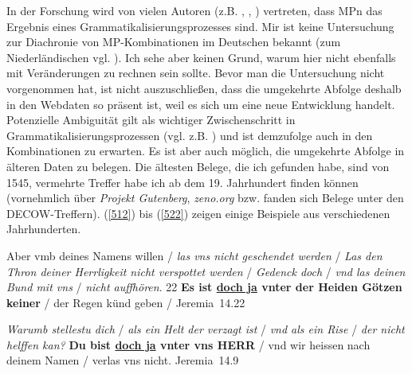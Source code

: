 In der Forschung wird von vielen Autoren (z.B. \citealt{Abraham1991b}, \citealt{Diewald1997}, \citealt{Wegener2002}) vertreten, dass MPn das Ergebnis eines Grammatikalisierungspro\-zesses sind. Mir ist keine Untersuchung zur Diachronie von MP-Kombinationen im Deutschen bekannt (zum Niederländischen vgl. \citealt{Hoeksema2008}). Ich sehe aber keinen Grund, warum hier nicht ebenfalls mit Veränderungen zu rechnen sein sollte. Bevor man die Untersuchung nicht vorgenommen hat, ist nicht auszu\-schließen, dass die umgekehrte Abfolge deshalb in den Webdaten so präsent ist, weil es sich um eine neue Entwicklung handelt. Potenzielle Ambiguität  gilt als wichtiger Zwischenschritt in  Grammatikalisierungsprozessen (vgl. z.B. \citealt[137-138, 141, 144]{Diewald2008})  und ist demzufolge auch in den Kombinationen zu erwarten. Es ist aber auch möglich, die umgekehrte Abfolge in älteren Daten zu belegen. Die ältesten Belege, die ich gefunden habe, sind von 1545, vermehrte Tref\-fer habe ich ab dem 19. Jahrhundert finden können (vornehmlich über \textit{Projekt Gutenberg}, \textit{zeno.org} bzw. fanden sich Belege unter den DECOW-Treffern). (\ref{512}) bis (\ref{522}) zeigen einige Beispiele aus verschiedenen Jahrhunderten.

\begin{exe}
	\ex\label{512} 
	\scriptsize
	Aber vmb deines Namens willen / \emph{las vns nicht geschendet werden} / \emph{Las den Thron deiner Herrligkeit nicht verspottet 			werden} / \emph{Gedenck doch} / \emph{vnd las deinen Bund mit vns} / \emph{nicht auffhören}. 22 \textbf{Es ist \underline{doch ja} vnter der Heiden Götzen keiner} / der Regen künd geben / 
	\hfill\hbox{Jeremia 14.22}
\end{exe}	

\begin{exe}
	\ex\label{513} 
	\scriptsize
	\emph{Warumb stellestu dich} / \emph{als ein Helt der verzagt ist} / \emph{vnd als ein Rise} / \emph{der nicht 						helffen kan?} \textbf{Du bist \underline{doch ja} vnter vns HERR} / vnd wir heissen nach deinem Namen / verlas vns nicht. 
	\hfill\hbox{Jeremia 14.9}
\end{exe}	


